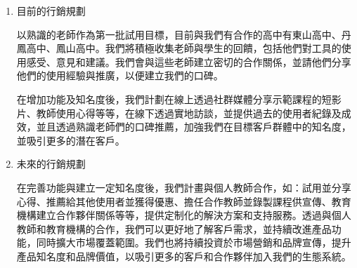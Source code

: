 \begin{enumerate}[label=(\arabic*)]
  \item 目前的行銷規劃
  	\par 以熟識的老師作為第一批試用目標，目前與我們有合作的高中有東山高中、丹鳳高中、鳳山高中。我們將積極收集老師與學生的回饋，包括他們對工具的使用感受、意見和建議。我們會與這些老師建立密切的合作關係，並請他們分享他們的使用經驗與推廣，以便建立我們的口碑。
  	\par 在增加功能及知名度後，我們計劃在線上透過社群媒體分享示範課程的短影片、教師使用心得等等，在線下透過實地訪談，並提供過去的使用者紀錄及成效，並且透過熟識老師們的口碑推薦，加強我們在目標客戶群體中的知名度，並吸引更多的潛在客戶。
  \item 未來的行銷規劃
  	\par 在完善功能與建立一定知名度後，我們計畫與個人教師合作，如：試用並分享心得、推薦給其他使用者並獲得優惠、擔任合作教師並錄製課程供宣傳、教育機構建立合作夥伴關係等等，提供定制化的解決方案和支持服務。透過與個人教師和教育機構的合作，我們可以更好地了解客戶需求，並持續改進產品功能，同時擴大市場覆蓋範圍。我們也將持續投資於市場營銷和品牌宣傳，提升產品知名度和品牌價值，以吸引更多的客戶和合作夥伴加入我們的生態系統。
\end{enumerate}
